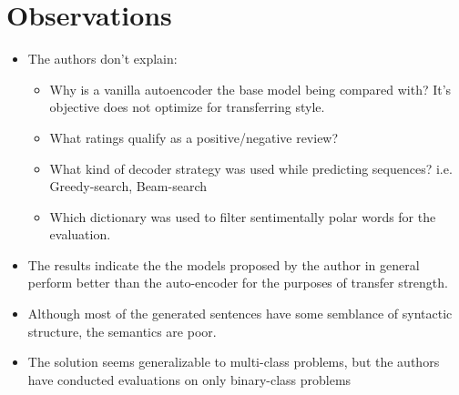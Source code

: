 \documentclass[12pt]{article}
\begin{document}
\section{Observations}
  \begin{itemize}
    \item The authors don't explain:
    \begin{itemize}
      \item Why is a vanilla autoencoder the base model being compared with? It's objective does not optimize for transferring style.
      \item What ratings qualify as a positive/negative review?
      \item What kind of decoder strategy was used while predicting sequences? i.e. Greedy-search, Beam-search
      \item Which dictionary was used to filter sentimentally polar words for the evaluation.
    \end{itemize}
    \item The results indicate the the models proposed by the author in general perform better than the auto-encoder for the purposes of transfer strength.
    \item Although most of the generated sentences have some semblance of syntactic structure, the semantics are poor.
    \item The solution seems generalizable to multi-class problems, but the authors have conducted evaluations on only binary-class problems
  \end{itemize}



\end{document}
